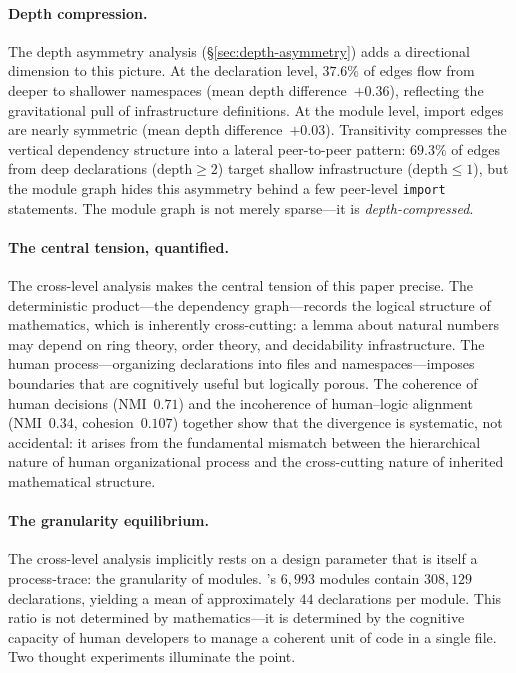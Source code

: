 \paragraph{Depth compression.} The depth asymmetry analysis (\S\ref{sec:depth-asymmetry}) adds a directional dimension to this picture. At the declaration level, $37.6\%$ of edges flow from deeper to shallower namespaces (mean depth difference~$+0.36$), reflecting the gravitational pull of infrastructure definitions. At the module level, import edges are nearly symmetric (mean depth difference~$+0.03$). Transitivity compresses the vertical dependency structure into a lateral peer-to-peer pattern: $69.3\%$ of edges from deep declarations ($\mathrm{depth} \ge 2$) target shallow infrastructure ($\mathrm{depth} \le 1$), but the module graph hides this asymmetry behind a few peer-level \texttt{import} statements. The module graph is not merely sparse---it is \emph{depth-compressed}.

\paragraph{The central tension, quantified.} The cross-level analysis makes the central tension of this paper precise. The deterministic product---the dependency graph---records the logical structure of mathematics, which is inherently cross-cutting: a lemma about natural numbers may depend on ring theory, order theory, and decidability infrastructure. The human process---organizing declarations into files and namespaces---imposes boundaries that are cognitively useful but logically porous. The coherence of human decisions (NMI~$0.71$) and the incoherence of human--logic alignment (NMI~$0.34$, cohesion~$0.107$) together show that the divergence is systematic, not accidental: it arises from the fundamental mismatch between the hierarchical nature of human organizational process and the cross-cutting nature of inherited mathematical structure.

\paragraph{The granularity equilibrium.}
The cross-level analysis implicitly rests on a design parameter that is itself a process-trace: the granularity of modules. 's $6{,}993$ modules contain $308{,}129$ declarations, yielding a mean of approximately $44$ declarations per module. This ratio is not determined by mathematics---it is determined by the cognitive capacity of human developers to manage a coherent unit of code in a single file. Two thought experiments illuminate the point.

